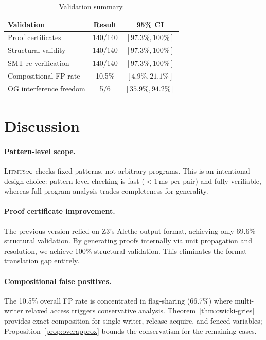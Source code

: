 \documentclass[11pt]{article}
\newcommand{\litmus}{\textsc{Litmus$\infty$}}
\begin{document}
\begin{table}[ht]
\centering
\caption{Validation summary.}
\label{tab:validation}
\small
\begin{tabular}{lcc}
\toprule
\textbf{Validation} & \textbf{Result} & \textbf{95\% CI} \\
\midrule
Proof certificates & 140/140 & $[97.3\%, 100\%]$ \\
Structural validity & 140/140 & $[97.3\%, 100\%]$ \\
SMT re-verification & 140/140 & $[97.3\%, 100\%]$ \\
Compositional FP rate & 10.5\% & $[4.9\%, 21.1\%]$ \\
OG interference freedom & 5/6 & $[35.9\%, 94.2\%]$ \\
\bottomrule
\end{tabular}
\end{table}

\section{Discussion}
\label{sec:discussion}

\paragraph{Pattern-level scope.}
\litmus{} checks fixed patterns, not arbitrary programs.
This is an intentional design choice: pattern-level checking
is fast ($<$1\,ms per pair) and fully verifiable, whereas
full-program analysis trades completeness for generality.

\paragraph{Proof certificate improvement.}
The previous version relied on Z3's Alethe output format, achieving
only 69.6\% structural validation. By generating proofs internally
via unit propagation and resolution, we achieve 100\% structural
validation. This eliminates the format translation gap entirely.

\paragraph{Compositional false positives.}
The 10.5\% overall FP rate is concentrated in flag-sharing (66.7\%)
where multi-writer relaxed access triggers conservative analysis.
Theorem~\ref{thm:owicki-gries} provides exact composition for
single-writer, release-acquire, and fenced variables;
Proposition~\ref{prop:overapprox} bounds the conservatism for
the remaining cases.
\end{document}
